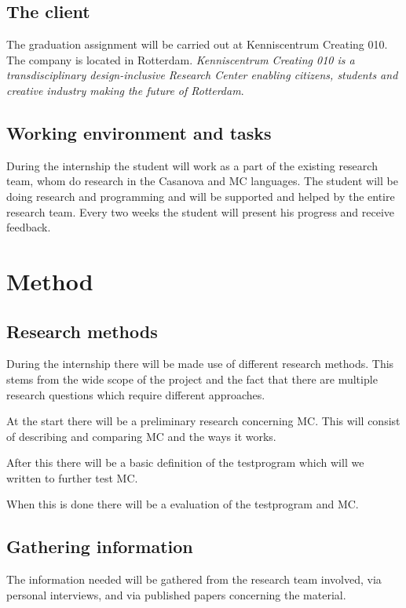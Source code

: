 \section{The client}\label{sec:clientmandate}
The graduation assignment will be carried out at Kenniscentrum Creating 010.
The company is located in Rotterdam.
\textit{Kenniscentrum Creating 010 is a transdisciplinary design-inclusive Research Center enabling citizens, students and creative industry making the future of Rotterdam}\cite{creating2016home}.

\section{Working environment and tasks}\label{sec:workenvmandate}
During the internship the student will work as a part of the existing research team, whom do research in the Casanova and MC languages.
The student will be doing research and programming and will be supported and helped by the entire research team.
Every two weeks the student will present his progress and receive feedback.


\chapter{Method}\label{ch:methodmandate}
\section{Research methods}
During the internship there will be made use of different research methods.
This stems from the wide scope of the project and the fact that there are multiple research questions which require different approaches.

At the start there will be a preliminary research concerning MC.
This will consist of describing and comparing MC and the ways it works.

After this there will be a basic definition of the testprogram which will we written to further test MC.

When this is done there will be a evaluation of the testprogram and MC.

\section{Gathering information}
The information needed will be gathered from the research team involved, via personal interviews, and via published papers concerning the material.

